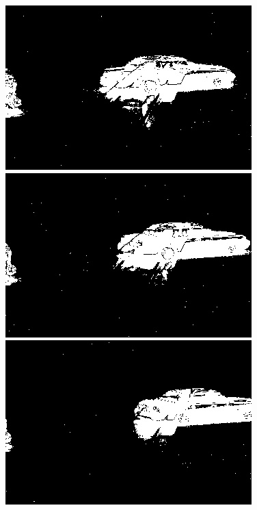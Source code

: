 \documentclass[a4paper]{ctexart}
\begin{document}
\begin{figure}[htbp]
	\centering
	\begin{minipage}[t]{0.2\textwidth}
		\centering
		\includegraphics[width=\textwidth]{figure/frames/single_gT01400.jpg}
	\end{minipage}
	\begin{minipage}[t]{0.2\textwidth}
		\centering
		\includegraphics[width=\textwidth]{figure/frames/single_gT01405.jpg}
	\end{minipage}
	\begin{minipage}[t]{0.2\textwidth}
		\centering
		\includegraphics[width=\textwidth]{figure/frames/single_gT01410.jpg}

\end{minipage}
\end{figure}
\end{document}
